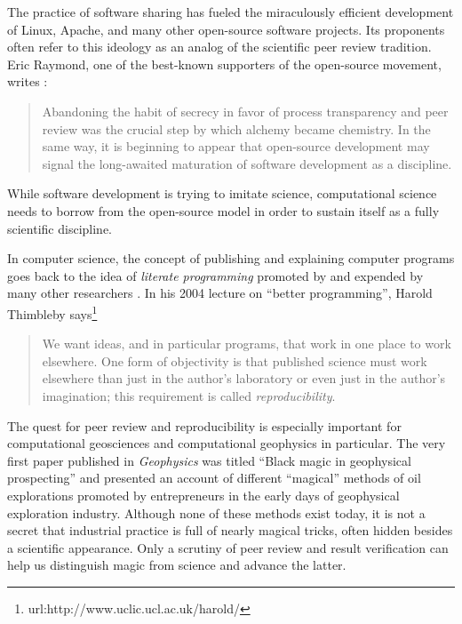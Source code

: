 The practice of software sharing has fueled the miraculously efficient
development of Linux, Apache, and many other open-source software projects.
Its proponents often refer to this ideology as an analog of the scientific
peer review tradition. Eric Raymond, one of the best-known supporters of the
open-source movement, writes \cite[]{taoup}:
\begin{quote}
  Abandoning the habit of secrecy in favor of process transparency and
  peer review was the crucial step by which alchemy became chemistry. In the
  same way, it is beginning to appear that open-source development may signal
  the long-awaited maturation of software development as a discipline. 
\end{quote}
While software development is trying to imitate science, computational science
needs to borrow from the open-source model in order to sustain itself as a
fully scientific discipline.

In computer science, the concept of publishing and explaining computer
programs goes back to the idea of \emph{literate programming} promoted by
\cite{knuth} and expended by many other researchers \cite[]{thimbleby}. In his
2004 lecture on ``better programming'', Harold Thimbleby
says\footnote{url:http://www.uclic.ucl.ac.uk/harold/}
\begin{quote}
  We want ideas, and in particular programs, that work in one place to work
  elsewhere. One form of objectivity is that published science must work
  elsewhere than just in the author's laboratory or even just in the author's
  imagination; this requirement is called \emph{reproducibility}.
\end{quote}

The quest for peer review and reproducibility is especially important for
computational geosciences and computational geophysics in particular. The very
first paper published in \emph{Geophysics} was titled ``Black magic in
geophysical prospecting'' \cite[]{GEO01-01-00010008,TLE02-03-00280031} and
presented an account of different ``magical'' methods of oil explorations
promoted by entrepreneurs in the early days of geophysical exploration
industry. Although none of these methods exist today, it is not a secret that
industrial practice is full of nearly magical tricks, often hidden besides a
scientific appearance. Only a scrutiny of peer review and result verification
can help us distinguish magic from science and advance the latter.

